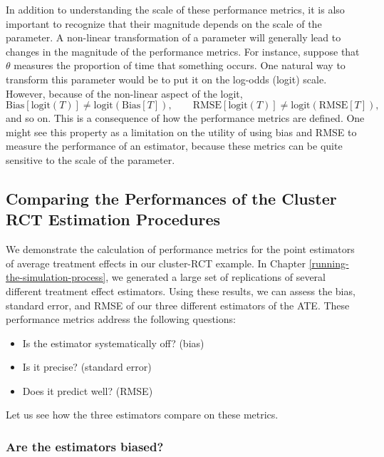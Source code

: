 \documentclass[
]{book}
\providecommand{\tightlist}{%
  \setlength{\itemsep}{0pt}\setlength{\parskip}{0pt}}
\begin{document}
In addition to understanding the scale of these performance metrics, it is also important to recognize that their magnitude depends on the scale of the parameter.
A non-linear transformation of a parameter will generally lead to changes in the magnitude of the performance metrics.
For instance, suppose that \(\theta\) measures the proportion of time that something occurs.
One natural way to transform this parameter would be to put it on the log-odds (logit) scale.
However, because of the non-linear aspect of the logit,
\[\text{Bias}\left[\text{logit}(T)\right] \neq \text{logit}\left(\text{Bias}[T]\right), \qquad \text{RMSE}\left[\text{logit}(T)\right] \neq \text{logit}\left(\text{RMSE}[T]\right),\]
and so on.
This is a consequence of how the performance metrics are defined.
One might see this property as a limitation on the utility of using bias and RMSE to measure the performance of an estimator, because these metrics can be quite sensitive to the scale of the parameter.

\subsection{Comparing the Performances of the Cluster RCT Estimation Procedures}\label{clusterRCTperformance}

We demonstrate the calculation of performance metrics for the point estimators of average treatment effects in our cluster-RCT example.
In Chapter \ref{running-the-simulation-process}, we generated a large set of replications of several different treatment effect estimators.
Using these results, we can assess the bias, standard error, and RMSE of our three different estimators of the ATE.
These performance metrics address the following questions:

\begin{itemize}
\tightlist
\item
  Is the estimator systematically off? (bias)
\item
  Is it precise? (standard error)
\item
  Does it predict well? (RMSE)
\end{itemize}

Let us see how the three estimators compare on these metrics.

\subsubsection*{Are the estimators biased?}\label{are-the-estimators-biased}
\end{document}
